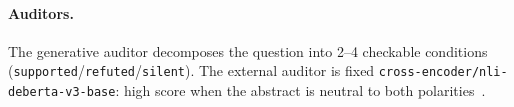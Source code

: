 \paragraph{Auditors.}
The generative auditor decomposes the question into 2--4 checkable conditions
(\texttt{supported}/\texttt{refuted}/\texttt{silent}). The external auditor is
fixed \texttt{cross-encoder/nli-deberta-v3-base}: high score when the abstract
is neutral to both polarities~\citep{abdaljalil2026knowing}.
